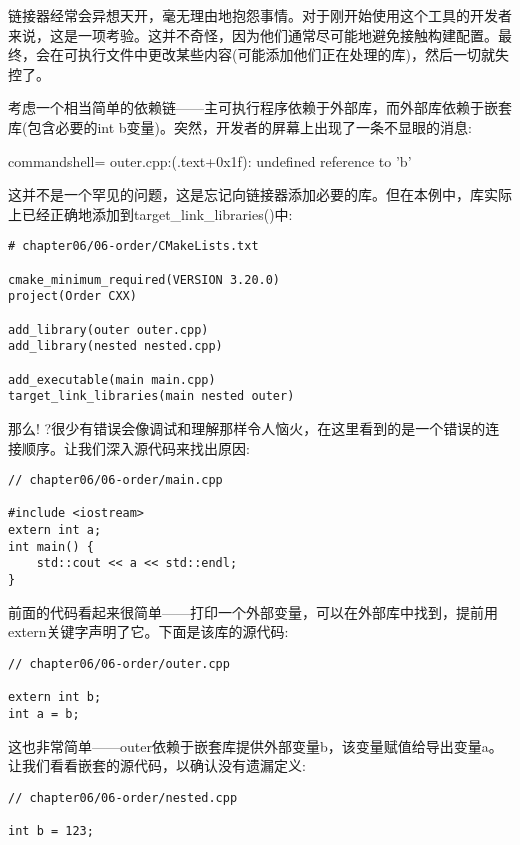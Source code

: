 链接器经常会异想天开，毫无理由地抱怨事情。对于刚开始使用这个工具的开发者来说，这是一项考验。这并不奇怪，因为他们通常尽可能地避免接触构建配置。最终，会在可执行文件中更改某些内容(可能添加他们正在处理的库)，然后一切就失控了。

考虑一个相当简单的依赖链——主可执行程序依赖于外部库，而外部库依赖于嵌套库(包含必要的int b变量)。突然，开发者的屏幕上出现了一条不显眼的消息:

\begin{tcblisting}{commandshell={}}
outer.cpp:(.text+0x1f): undefined reference to 'b'
\end{tcblisting}

这并不是一个罕见的问题，这是忘记向链接器添加必要的库。但在本例中，库实际上已经正确地添加到target\_link\_libraries()中:

\begin{lstlisting}[style=styleCMake]
# chapter06/06-order/CMakeLists.txt

cmake_minimum_required(VERSION 3.20.0)
project(Order CXX)

add_library(outer outer.cpp)
add_library(nested nested.cpp)

add_executable(main main.cpp)
target_link_libraries(main nested outer)
\end{lstlisting}

那么! ?很少有错误会像调试和理解那样令人恼火，在这里看到的是一个错误的连接顺序。让我们深入源代码来找出原因:

\begin{lstlisting}[style=styleCXX]
// chapter06/06-order/main.cpp

#include <iostream>
extern int a;
int main() {
	std::cout << a << std::endl;
}
\end{lstlisting}

前面的代码看起来很简单——打印一个外部变量，可以在外部库中找到，提前用extern关键字声明了它。下面是该库的源代码:

\begin{lstlisting}[style=styleCXX]
// chapter06/06-order/outer.cpp

extern int b;
int a = b;
\end{lstlisting}

这也非常简单——outer依赖于嵌套库提供外部变量b，该变量赋值给导出变量a。让我们看看嵌套的源代码，以确认没有遗漏定义:

\begin{lstlisting}[style=styleCXX]
// chapter06/06-order/nested.cpp

int b = 123;
\end{lstlisting}

